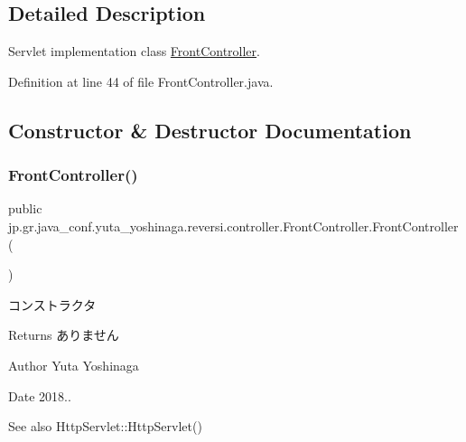\subsection{Detailed Description}
Servlet implementation class \mbox{\hyperlink{classjp_1_1gr_1_1java__conf_1_1yuta__yoshinaga_1_1reversi_1_1controller_1_1_front_controller}{Front\+Controller}}. 

Definition at line 44 of file Front\+Controller.\+java.



\subsection{Constructor \& Destructor Documentation}
\mbox{\label{classjp_1_1gr_1_1java__conf_1_1yuta__yoshinaga_1_1reversi_1_1controller_1_1_front_controller_a918d736b7b4d8672076c15f8ca05075c}} 
\subsubsection{\texorpdfstring{Front\+Controller()}{FrontController()}}
{\footnotesize\ttfamily public jp.\+gr.\+java\+\_\+conf.\+yuta\+\_\+yoshinaga.\+reversi.\+controller.\+Front\+Controller.\+Front\+Controller (\begin{DoxyParamCaption}{ }\end{DoxyParamCaption})}



コンストラクタ 

\begin{DoxyReturn}{Returns}
ありません 
\end{DoxyReturn}
\begin{DoxyAuthor}{Author}
Yuta Yoshinaga 
\end{DoxyAuthor}
\begin{DoxyDate}{Date}
2018.. 
\end{DoxyDate}
\begin{DoxySeeAlso}{See also}
Http\+Servlet\+::\+Http\+Servlet() 
\end{DoxySeeAlso}


